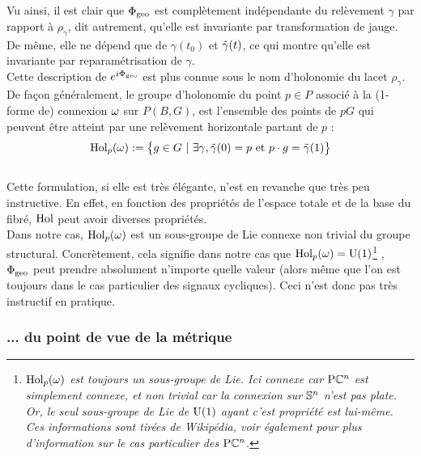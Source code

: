 \noindent Vu ainsi, il est clair que $\phaseg$ est complètement indépendante du relèvement $\gamma$ par rapport à $\rho_\gamma$, dit autrement, qu'elle est invariante par transformation de jauge. De même, elle ne dépend que de $\gamma(t_0)$ et $\Tilde{\gamma}(t)$, ce qui montre qu'elle est invariante par reparamétrisation de $\gamma$.
\\

Cette description de  $e^{i\phaseg}$ est plus connue sous le nom d’holonomie du lacet $\rho_\gamma$. De façon généralement, le groupe d'holonomie du point $p\in P$ associé à la (1-forme de) connexion $\conn$ sur $P(B,G)$, est l'ensemble des points de $pG$ qui peuvent être atteint par une relèvement horizontale partant de $p$ :
\begin{equation} \label{eq:def2Hol}
	\Hol_p(\conn) \defeq \big\{ g\in G\ |\ \exists \gamma, \Tilde{\gamma}(0) = p \text{ et } p\cdot g = \Tilde{\gamma}(1) \big\}
\end{equation}
\\
Cette formulation, si elle est très élégante, n'est en revanche que très peu instructive. En effet, en fonction des propriétés de l'espace totale et de la base du fibré, $\Hol$ peut avoir diverses propriétés. 
\\
Dans notre cas, $\Hol_p(\conn)$ est un sous-groupe de Lie connexe non trivial du groupe structural. Concrètement, cela signifie dans notre cas que $\Hol_p(\conn)=\U{1}$\footnote{\itshape
	$\Hol_p(\conn)$ est toujours un sous-groupe de Lie. Ici connexe car $\PC{n}$ est simplement connexe, et non trivial car la connexion sur $\S{n}$ n'est pas plate.  Or, le seul sous-groupe de Lie de $\U{1}$ ayant c'est propriété est lui-même. Ces informations sont tirées de Wikipédia, voir également \cite[sec. 8.5.3]{nakahara_geometry_2003} pour plus d'information sur le cas particulier des $\PC{n}$.}
, \ie~$\phaseg$ peut prendre absolument n'importe quelle valeur (alors même que l'on est toujours dans le cas particulier des signaux cycliques). Ceci n'est donc pas très instructif en pratique.
\\



\subsubsection{\wip ... du point de vue de la métrique} \label{subsec:phase_g2aire}

